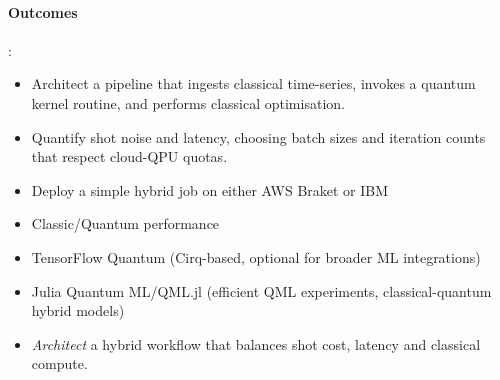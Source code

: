\paragraph{Outcomes}:
\begin{itemize}
	\item Architect a pipeline that ingests classical time-series, invokes a quantum kernel routine, and performs classical optimisation.
	\item Quantify shot noise and latency, choosing batch sizes and iteration counts that respect cloud-QPU quotas.
	\item Deploy a simple hybrid job on either AWS Braket or IBM
	\item Classic/Quantum performance 
	\item TensorFlow Quantum (Cirq-based, optional for broader ML integrations)
	\item Julia Quantum ML/QML.jl (efficient QML experiments, classical-quantum hybrid models)
	\item \emph{Architect} a hybrid workflow that balances shot cost, latency and classical compute.
\end{itemize}